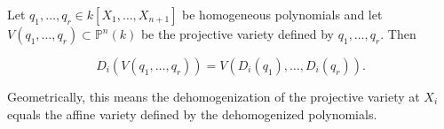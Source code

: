 Let $q_1, \ldots, q_r \in k[X_1, \ldots, X_{n+1}]$ be homogeneous polynomials and let $V(q_1, \ldots, q_r) \subset \mathbb{P}^n(k)$ be the projective variety defined by $q_1, \ldots, q_r$. Then

$$D_i(V(q_1, \ldots, q_r)) = V(D_i(q_1), \ldots, D_i(q_r)).$$

Geometrically, this means the dehomogenization of the projective variety at $X_i$ equals the affine variety defined by the dehomogenized polynomials.
